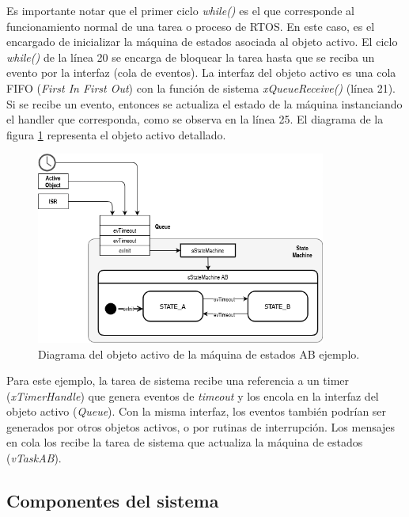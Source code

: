 Es importante notar que el primer ciclo \textit{while()} es el que corresponde al funcionamiento normal de una tarea o proceso de RTOS. En este caso, es el encargado de inicializar la máquina de estados asociada al objeto activo. El ciclo \textit{while()} de la línea 20 se encarga de bloquear la tarea hasta que se reciba un evento por la interfaz (cola de eventos). La interfaz del objeto activo es una cola FIFO (\textit{First In First Out}) con la función de sistema \textit{xQueueReceive() }(línea 21). Si se recibe un evento, entonces se actualiza el estado de la máquina instanciando el handler que corresponda, como se observa en la línea 25. El diagrama de la figura \ref{fig:AOfsmAB} representa el objeto activo detallado. 

\begin{figure}[ht]
	\centering
	\includegraphics[width=0.85\textwidth]{./Figures/AOstatemachineAB.png}
	\caption{Diagrama del objeto activo de la máquina de estados AB ejemplo.}
	\label{fig:AOfsmAB}
\end{figure}

Para este ejemplo, la tarea de sistema recibe una referencia a un timer (\textit{xTimerHandle}) que genera eventos de \textit{timeout} y los encola en la interfaz del objeto activo (\textit{Queue}). Con la misma interfaz, los eventos también podrían ser generados por otros objetos activos, o por rutinas de interrupción. Los mensajes en cola los recibe  la tarea de sistema que actualiza la máquina de estados (\textit{vTaskAB}).\\

\subsection{Componentes del sistema}

